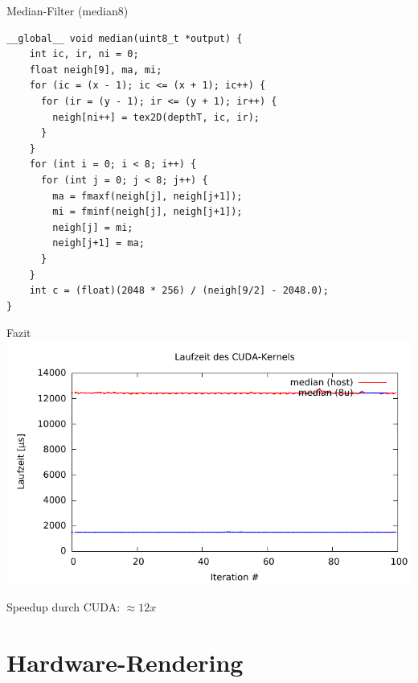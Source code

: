 \documentclass[compress]{beamer}
\begin{document}
\begin{frame}[fragile]{Median-Filter (median8)}
\lstset{basicstyle=\small\ttfamily}
\begin{lstlisting}
__global__ void median(uint8_t *output) {
    int ic, ir, ni = 0;
    float neigh[9], ma, mi;
    for (ic = (x - 1); ic <= (x + 1); ic++) {
      for (ir = (y - 1); ir <= (y + 1); ir++) {
        neigh[ni++] = tex2D(depthT, ic, ir);
      }
    }
    for (int i = 0; i < 8; i++) {
      for (int j = 0; j < 8; j++) {
        ma = fmaxf(neigh[j], neigh[j+1]);
        mi = fminf(neigh[j], neigh[j+1]);
        neigh[j] = mi;
        neigh[j+1] = ma;
      }
    }
    int c = (float)(2048 * 256) / (neigh[9/2] - 2048.0);
}
\end{lstlisting}
\end{frame}


\begin{frame}[fragile]{Fazit}
\includegraphics[width=\textwidth]{medianhost.pdf}\\
\begin{center}
Speedup durch CUDA: $\approx 12x$
\end{center}
\end{frame}
\section{Hardware-Rendering}
\end{document}
